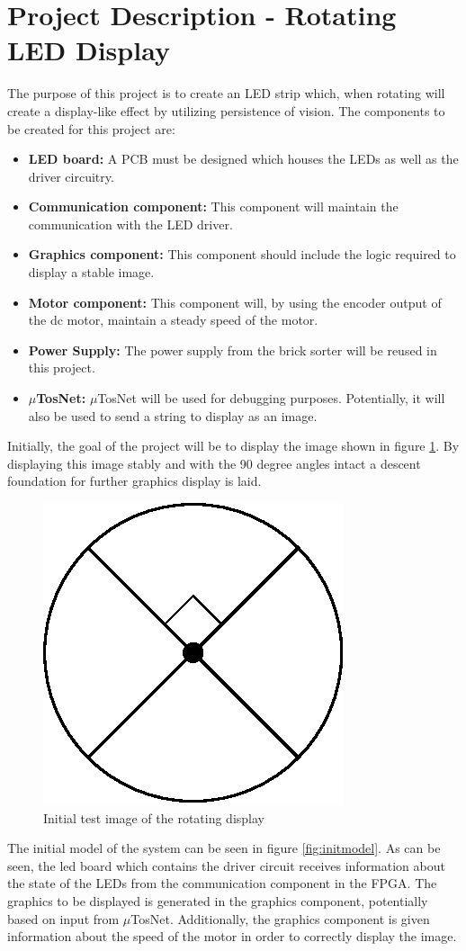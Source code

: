 \documentclass[a4paper,10pt]{article}
\title{}
\author{}
\begin{document}
	\section{Project Description - Rotating LED Display}
	The purpose of this project is to create an LED strip which, when rotating will create a display-like effect by utilizing persistence of vision.
	The components to be created for this project are:
	\begin{itemize}
		\item \textbf{LED board:} A PCB must be designed which houses the LEDs as well as the driver circuitry.
		\item \textbf{Communication component:} This component will maintain the communication with the LED driver.
		\item \textbf{Graphics component:} This component should include the logic required to display a stable image.
		\item \textbf{Motor component:} This component will, by using the encoder output of the dc motor, maintain a steady speed of the motor.
		\item \textbf{Power Supply:} The power supply from the brick sorter will be reused in this project.
		\item \textbf{$\mu$TosNet:} $\mu$TosNet will be used for debugging purposes.
		Potentially, it will also be used to send a string to display as an image.
	\end{itemize}
	Initially, the goal of the project will be to display the image shown in figure \ref{fig:circle}. 
	By displaying this image stably and with the 90 degree angles intact a descent foundation for further graphics display is laid.
	
	\begin{figure}[h!]
		\centering
		\includegraphics[width=.25\linewidth]{images/circle}
		\caption{Initial test image of the rotating display}
		\label{fig:circle}
	\end{figure}
	
	The initial model of the system can be seen in figure \ref{fig:initmodel}. As can be seen, the led board which contains the driver circuit receives information about the state of the LEDs from the communication component in the FPGA. The graphics to be displayed is generated in the graphics component, potentially based on input from $\mu$TosNet. Additionally, the graphics component is given information about the speed of the motor in order to correctly display the image.
	
\end{document}
